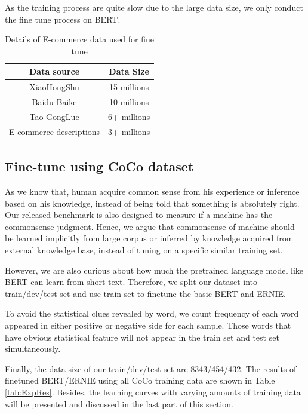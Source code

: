 As the training process are quite slow due to the large data size, we only conduct the fine tune process on BERT.%

\begin{table}
	\small
	\centering
	\begin{tabular}{cc}
		\toprule[1.1pt]
		Data source & Data Size \\
		\hline
		XiaoHongShu & 15 millions \\
		Baidu Baike & 10 millions \\
		Tao GongLue & 6+ millions \\
		E-commerce descriptions & 3+ millions \\
		\bottomrule[1.1pt]
	\end{tabular}
	\caption{Details of E-commerce data used for fine tune}
	\label{tab:DetailData}
\end{table}

\subsection{Fine-tune using CoCo dataset}
As we know that, human acquire common sense from his experience or inference based on his knowledge, instead of being told that something is absolutely right. Our released benchmark is also designed to measure if a machine has the commonsense judgment. Hence, we argue that commonsense of machine should be learned implicitly from large corpus or inferred by knowledge acquired from external knowledge base, instead of tuning on a specific similar training set.

However, we are also curious about how much the pretrained language model like BERT can learn from short text. Therefore, we split our dataset into train/dev/test set and use train set to finetune the basic BERT and ERNIE.

To avoid the statistical clues revealed by word, we count frequency of each word appeared in either positive or negative side for each sample. Those words that have obvious statistical feature will not appear in the train set and test set simultaneously.

Finally, the data size of our train/dev/test set are 8343/454/432. The results of finetuned BERT/ERNIE using all CoCo training data are shown in Table \ref{tab:ExpRes}. Besides, the learning curves with varying amounts of  training data will be presented and discussed in the last part of this section.  

